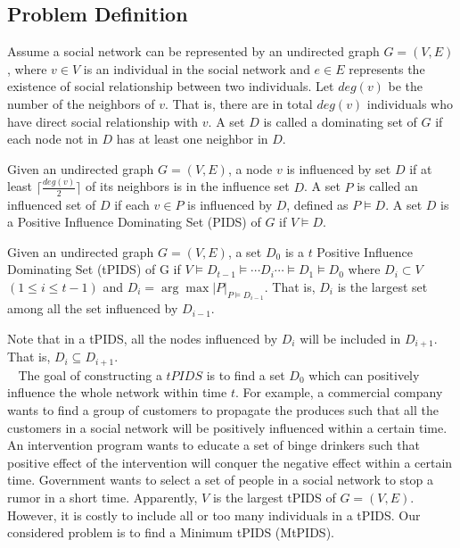 \subsection{Problem Definition}
\label{sec:2}
Assume a social network can be represented by an undirected graph $G=(V,E)$, where $v \in V$ is an individual in the social network and $e \in E$ represents the existence of social
relationship between two individuals.
Let $deg(v)$ be the number of the neighbors of $v$.
That is, there are in total $deg(v)$ individuals who have direct social relationship with $v$.
A set $D$ is called a dominating set of $G$ if each node not in $D$ has at least one neighbor in $D$.
\begin{definition}
	Given an undirected graph $G=(V, E)$, a node $v$ is influenced by set $D$ if at least $\lceil \frac{deg(v)}{2} \rceil$ of its neighbors is in the influence set $D$.
	A set $P$ is called an influenced set of $D$ if each $v \in P$ is influenced by $D$, defined as $P \models D$.
	A set $D$ is a Positive Influence Dominating Set (PIDS) of $G$ if $V \models D$.
\end{definition}
\begin{definition}
	Given an undirected graph $G=(V, E)$, a set $D_0$ is a $t$ Positive Influence Dominating Set (tPIDS) of G if
	$V \models D_{t-1} \models \cdots D_i \cdots \models D_1 \models D_0$ where $D_i \subset V$ $(1 \le i \le t-1)$ and $D_i=\arg \max |P|_{P \models D_{i-1}}$.
	That is, $D_i$ is the largest set among all the set influenced by $D_{i-1}$.
\end{definition}
Note that in a tPIDS, all the nodes influenced by $D_i$ will be included in $D_{i+1}$.
That is, $D_i \subseteq D_{i+1}$.\\
$~~~~$The goal of constructing a $tPIDS$ is to find a set $D_0$ which can positively influence the whole network within time $t$.
For example, a commercial company wants to find a group of customers to propagate the produces such that all the customers
in a social network will be positively influenced within a certain time.
An intervention program wants to educate a set of binge drinkers such that positive effect of the intervention will conquer the negative effect within a certain time.
Government wants to select a set of people in a social network to stop a rumor in
a short time.
Apparently, $V$ is the largest tPIDS of $G=(V, E)$.
However, it is costly to include all or too many individuals in a tPIDS.
Our considered problem is to find a Minimum tPIDS (MtPIDS).
